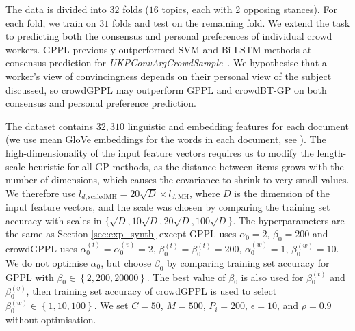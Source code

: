 The data is divided into $32$ folds ($16$ topics, each with 2 opposing stances). For each fold, we train on $31$ folds and test on the remaining fold.
We extend
the task 
to predicting both the consensus and personal preferences of individual crowd workers.
GPPL previously outperformed SVM and Bi-LSTM methods at consensus prediction for \emph{UKPConvArgCrowdSample}~\citep{simpson2018finding}. 
We hypothesise that a worker's view of convincingness 
depends on their personal view of the subject 
discussed, so crowdGPPL may outperform GPPL and
 crowdBT-GP on both consensus and personal preference prediction.

The dataset contains $32,310$ linguistic and embedding features
for each document (we use mean GloVe embeddings for the words in each document, see \citet{simpson2018finding}). The high-dimensionality of the input feature vectors requires us to modify the length-scale heuristic for all GP methods,
as the distance between items grows with the number of dimensions,
which causes the covariance to shrink to very small values. We therefore use
$l_{d,\mathrm{scaledMH}} = 20\sqrt{D} \times l_{d,\mathrm{MH}}$, 
where $D$ is the dimension of the input feature vectors,
and the scale was chosen by comparing the training set accuracy 
with scales in $\{\sqrt{D}, 10\sqrt{D}, 20\sqrt{D}, 100\sqrt{D}\}$.
The hyperparameters are the same as Section \ref{sec:exp_synth} 
except GPPL uses $\alpha_0 = 2$, $\beta_0 = 200$ and
crowdGPPL uses $\alpha^{(t)}_0=\alpha^{(v)}_0=2$, $\beta^{(t)}_0=\beta^{(t)}_0=200$,
$\alpha^{(w)}_0=1$, $\beta^{(w)}_0=10$.
We do not optimise $\alpha_0$, but choose $\beta_0$ by comparing
training set accuracy for GPPL with $\beta_0 \in \left\{2,200,20000\right\}$.
The best value of $\beta_0$ is also used for $\beta^{(t)}_0$ and $\beta^{(v)}_0$, 
then training set accuracy of crowdGPPL is used to select 
$\beta^{(w)}_0 \in \left\{1, 10, 100 \right\}$.
We set $C=50$, $M=500$, $P_i=200$, $\epsilon=10$, and $\rho=0.9$ without optimisation.

